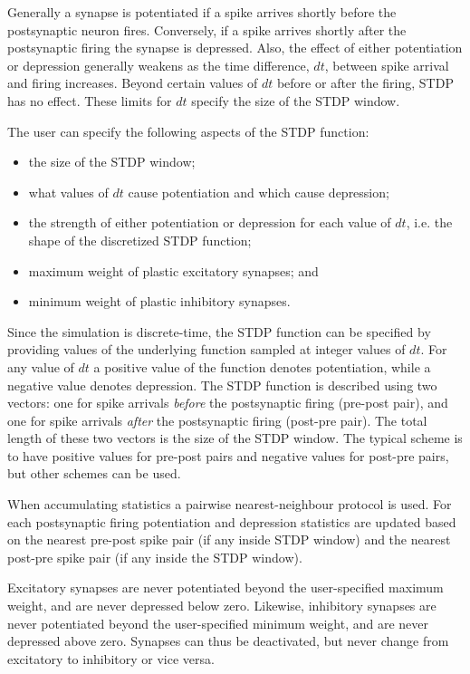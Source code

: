 \documentclass[a4paper]{article}
\begin{document}
Generally a synapse is potentiated if a spike arrives shortly before the postsynaptic neuron fires. 
Conversely, if a spike arrives shortly after the postsynaptic firing the synapse is depressed. 
Also, the effect of either potentiation or depression generally weakens as the time difference, $dt$, 
	between spike arrival and firing increases. 
Beyond certain values of $dt$ before or after the firing, STDP has no effect. 
These limits for $dt$ specify the size of the STDP window.

The user can specify the following aspects of the STDP function:

\begin{itemize}
	\item the size of the STDP window;
	\item what values of $dt$ cause potentiation and which cause depression;
	\item the strength of either potentiation or depression for each value of $dt$, 
		i.e. the shape of the discretized STDP function;
	\item maximum weight of plastic excitatory synapses; and
	\item minimum weight of plastic inhibitory synapses.
\end{itemize}

Since the simulation is discrete-time,
	the STDP function can be specified by providing values of the underlying function
	sampled at integer values of $dt$.
For any value of $dt$ a positive value of the function denotes potentiation, 
	while a negative value denotes depression.
The STDP function is described using two vectors: 
	one for spike arrivals \emph{before} the postsynaptic firing (pre-post pair),
	and one for spike arrivals \emph{after} the postsynaptic firing (post-pre pair).
The total length of these two vectors is the size of the STDP window.
The typical scheme is to have positive values for pre-post pairs and negative values for post-pre pairs,
but other schemes can be used.

When accumulating statistics a pairwise nearest-neighbour protocol is used.
For each postsynaptic firing potentiation and depression statistics are updated based
on the nearest pre-post spike pair (if any inside STDP window) 
and the nearest post-pre spike pair (if any inside the STDP window).

Excitatory synapses are never potentiated beyond the user-specified maximum weight,
and are never depressed below zero.
Likewise, inhibitory synapses are never potentiated beyond the  user-specified minimum weight,
and are never depressed above zero.
Synapses can thus be deactivated, but never change from excitatory to inhibitory or vice versa.
\end{document}
